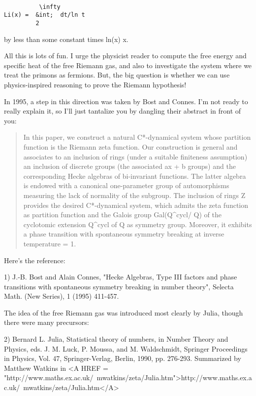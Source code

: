\begin{verbatim}

          \infty  
Li(x) =  &int;  dt/ln t  
         2
\end{verbatim}
    

by less than some constant times ln(x) \sqrt x.  

All this is lots of fun.  I urge the physicist reader to compute the free 
energy and specific heat of the free Riemann gas, and also to investigate
the system where we treat the primons as fermions.  But, the big question 
is whether we can use physics-inspired reasoning to prove the Riemann 
hypothesis!

In 1995, a step in this direction was taken by Bost and Connes.  I'm
not ready to really explain it, so I'll just tantalize you by dangling
their abstract in front of you:

\begin{quote}
    In this paper, we construct a natural C*-dynamical system whose 
    partition function is the Riemann zeta function.  Our construction 
    is general and associates to an inclusion of rings (under a 
    suitable finiteness assumption) an inclusion of discrete groups 
    (the associated ax + b groups) and the corresponding Hecke algebras 
    of bi-invariant functions.  The latter algebra is endowed with a
    canonical one-parameter group of automorphisms measuring the lack 
    of normality of the subgroup.  The inclusion of rings Z provides 
    the desired C*-dynamical system, which admits the zeta function 
    as partition function and the Galois group Gal(Q^{cycl}/ Q) of 
    the cyclotomic extension Q^{cycl} of Q as symmetry group.  Moreover, 
    it exhibits a phase transition with spontaneous symmetry breaking at 
    inverse temperature \beta  = 1.
\end{quote}

Here's the reference:

1) J.-B. Bost and Alain Connes, "Hecke Algebras, Type III factors and phase 
transitions with spontaneous symmetry breaking in number theory", Selecta 
Math. (New Series), 1 (1995) 411-457. 

The idea of the free Riemann gas was introduced most clearly by Julia, 
though there were many precursors:

2) Bernard L. Julia, Statistical theory of numbers, in Number Theory
and Physics, eds.  J. M. Luck, P. Moussa, and M. Waldschmidt, Springer
Proceedings in Physics, Vol. 47, Springer-Verlag, Berlin, 1990,
pp. 276-293.  Summarized by Matthew Watkins in
<A HREF = "http://www.maths.ex.ac.uk/~mwatkins/zeta/Julia.htm">http://www.maths.ex.ac.uk/~mwatkins/zeta/Julia.htm</A>

